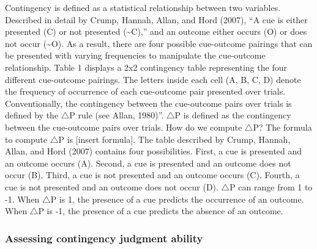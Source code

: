 \documentclass[
  english,
  man,floatsintext]{apa6}
\begin{document}
Contingency is defined as a statistical relationship between two variables. Described in detail by Crump, Hannah, Allan, and Hord (2007), ``A cue is either presented (C) or not presented (\textasciitilde C),'' and an outcome either occurs (O) or does not occur (\textasciitilde O). As a result, there are four possible cue-outcome pairings that can be presented with varying frequencies to manipulate the cue-outcome relationship. Table 1 displays a 2x2 contingency table representing the four different cue-outcome pairings. The letters inside each cell (A, B, C, D) denote the frequency of occurrence of each cue-outcome pair presented over trials. Conventionally, the contingency between the cue-outcome pairs over trials is defined by the \(\triangle\)P rule (see Allan, 1980)''. \(\triangle\)P is defined as the contingency between the cue-outcome pairs over trials. How do we compute \(\triangle\)P? The formula to compute \(\triangle\)P is {[}insert formula{]}. The table described by Crump, Hannah, Allan, and Hord (2007) contains four possibilities. First, a cue is presented and an outcome occurs (A). Second, a cue is presented and an outcome does not occur (B). Third, a cue is not presented and an outcome occurs (C). Fourth, a cue is not presented and an outcome does not occur (D). \(\triangle\)P can range from 1 to -1. When \(\triangle\)P is 1, the presence of a cue predicts the occurrence of an outcome. When \(\triangle\)P is -1, the presence of a cue predicts the absence of an outcome.

\hypertarget{assessing-contingency-judgment-ability}{%
\subsubsection{Assessing contingency judgment ability}\label{assessing-contingency-judgment-ability}}
\end{document}

